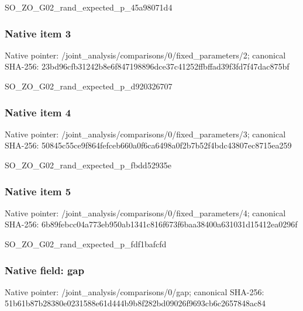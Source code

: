 \documentclass[10pt,a4paper]{article}
\begin{document}
\begingroup\raggedright\sloppy SO\_\allowbreak{}ZO\_\allowbreak{}G02\_\allowbreak{}rand\_\allowbreak{}expected\_\allowbreak{}p\_\allowbreak{}45a98071d4\par\endgroup

\subsubsection{Native item 3}
Native pointer: /joint\_\allowbreak{}analysis/comparisons/0/fixed\_\allowbreak{}parameters/2; canonical SHA-256: 23bd96cfb31242b8e6f847198896dce37c41252ffbffad39f3fd7f47dac875bf

\begingroup\raggedright\sloppy SO\_\allowbreak{}ZO\_\allowbreak{}G02\_\allowbreak{}rand\_\allowbreak{}expected\_\allowbreak{}p\_\allowbreak{}d920326707\par\endgroup

\subsubsection{Native item 4}
Native pointer: /joint\_\allowbreak{}analysis/comparisons/0/fixed\_\allowbreak{}parameters/3; canonical SHA-256: 50845c55ce9f864fefceb660a0f6ca6498a0f2b7b52f4bdc43807ec8715ea259

\begingroup\raggedright\sloppy SO\_\allowbreak{}ZO\_\allowbreak{}G02\_\allowbreak{}rand\_\allowbreak{}expected\_\allowbreak{}p\_\allowbreak{}fbdd52935e\par\endgroup

\subsubsection{Native item 5}
Native pointer: /joint\_\allowbreak{}analysis/comparisons/0/fixed\_\allowbreak{}parameters/4; canonical SHA-256: 6b89febcc04a773eb950ab1341c816f673f6baa38400a631031d15412ea0296f

\begingroup\raggedright\sloppy SO\_\allowbreak{}ZO\_\allowbreak{}G02\_\allowbreak{}rand\_\allowbreak{}expected\_\allowbreak{}p\_\allowbreak{}fdf1bafcfd\par\endgroup

\subsubsection{Native field: gap}
Native pointer: /joint\_\allowbreak{}analysis/comparisons/0/gap; canonical SHA-256: 51b61b87b28380e0231588e61d444b9b8f282bd09026f9693cb6c2657848ac84
\end{document}
